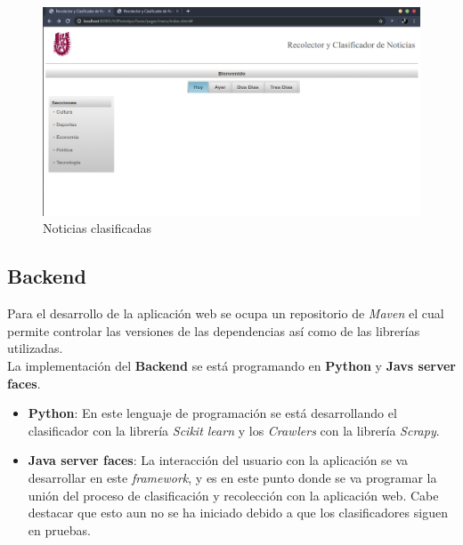 \begin{figure}[ht]
\centering
\includegraphics[scale=0.3]{imagenes/Aplicacion/mostrarNoticias.png}
\caption{Noticias clasificadas}
\label{fig:mostrarNoticias}
\end{figure}


\subsection{Backend}

Para el desarrollo de la aplicación web se ocupa un repositorio de \textit{Maven} el cual permite controlar las versiones de las dependencias así como de las librerías utilizadas.\\

La implementación del \textbf{Backend} se está programando en \textbf{Python} y \textbf{Javs server faces}.

\begin{itemize}
	\item \textbf{Python}: En este lenguaje de programación se está desarrollando el clasificador con la librería \textit{Scikit learn} y los \textit{Crawlers} con la librería \textit{Scrapy}.

	\item \textbf{Java server faces}: La interacción del usuario con la aplicación se va desarrollar en este \textit{framework}, y es en este punto donde se va programar la unión del proceso de clasificación y recolección con la aplicación web. Cabe destacar que esto aun no se ha iniciado debido a que los clasificadores siguen en pruebas.
\end{itemize}


